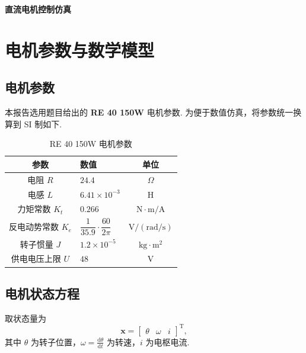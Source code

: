 \documentclass[a4paper, 12pt]{ctexart}
\begin{document}
\begin{center}
  {\bfseries 直流电机控制仿真}
\end{center}

\vspace{1em}

\tableofcontents
\clearpage

\section{电机参数与数学模型}

\subsection{电机参数}

本报告选用题目给出的 \textbf{RE 40 150W} 电机参数. 为便于数值仿真，将参数统一换算到 SI 制如下.

\begin{table}[H]
  \centering
  \caption{RE 40 150W 电机参数}

  \begin{tabular}{clc}
    \toprule
    参数           & 数值                                     & 单位                     \\
    \midrule
    电阻 $R$       & $24.4$                                 & $\Omega$               \\
    电感 $L$       & $6.41\times10^{-3}$                    & $\mathrm{H}$           \\
    力矩常数 $K_t$   & $0.266$                                & $\mathrm{N\cdot m/A}$  \\
    反电动势常数 $K_e$ & $\dfrac{1}{35.9}\cdot\dfrac{60}{2\pi}$ & $\mathrm{V/(rad/s)}$   \\
    转子惯量 $J$     & $1.2\times10^{-5}$                     & $\mathrm{kg\cdot m^2}$ \\
    供电电压上限 $U$   & $48$                                   & $\mathrm{V}$           \\
    \bottomrule
  \end{tabular}
\end{table}

\subsection{电机状态方程}

取状态量为
\[
  \boldsymbol{x} =
  \begin{bmatrix}
    \theta & \omega & i
  \end{bmatrix}^{\mathrm{T}},
\]
其中 $\theta$ 为转子位置，$\omega=\frac{\mathrm{d}\theta}{\mathrm{d}t}$ 为转速，$i$ 为电枢电流.
\end{document}
